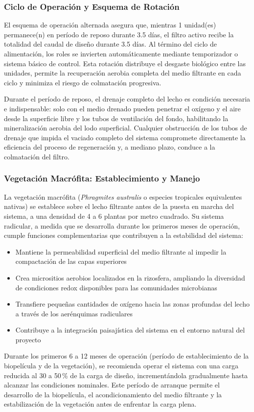 \subsubsection*{Ciclo de Operación y Esquema de Rotación}

El esquema de operación alternada asegura que, mientras 1 unidad(es) permanece(n) en período de reposo durante 3.5 días, el filtro activo recibe la totalidad del caudal de diseño durante 3.5 días. Al término del ciclo de alimentación, los roles se invierten automáticamente mediante temporizador o sistema básico de control. Esta rotación distribuye el desgaste biológico entre las unidades, permite la recuperación aerobia completa del medio filtrante en cada ciclo y minimiza el riesgo de colmatación progresiva.

Durante el período de reposo, el drenaje completo del lecho es condición necesaria e indispensable: solo con el medio drenado pueden penetrar el oxígeno y el aire desde la superficie libre y los tubos de ventilación del fondo, habilitando la mineralización aerobia del lodo superficial. Cualquier obstrucción de los tubos de drenaje que impida el vaciado completo del sistema compromete directamente la eficiencia del proceso de regeneración y, a mediano plazo, conduce a la colmatación del filtro.

\subsubsection*{Vegetación Macrófita: Establecimiento y Manejo}

La vegetación macrófita (\textit{Phragmites australis} o especies tropicales equivalentes nativas) se establece sobre el lecho filtrante antes de la puesta en marcha del sistema, a una densidad de 4 a 6 plantas por metro cuadrado. Su sistema radicular, a medida que se desarrolla durante los primeros meses de operación, cumple funciones complementarias que contribuyen a la estabilidad del sistema:

\begin{itemize}[noitemsep,leftmargin=2em]
    \item Mantiene la permeabilidad superficial del medio filtrante al impedir la compactación de las capas superiores
    \item Crea micrositios aerobios localizados en la rizosfera, ampliando la diversidad de condiciones redox disponibles para las comunidades microbianas
    \item Transfiere pequeñas cantidades de oxígeno hacia las zonas profundas del lecho a través de los aerénquimas radiculares
    \item Contribuye a la integración paisajística del sistema en el entorno natural del proyecto
\end{itemize}

Durante los primeros 6 a 12 meses de operación (período de establecimiento de la biopelícula y de la vegetación), se recomienda operar el sistema con una carga reducida al 30 a 50\,\% de la carga de diseño, incrementándola gradualmente hasta alcanzar las condiciones nominales. Este período de arranque permite el desarrollo de la biopelícula, el acondicionamiento del medio filtrante y la estabilización de la vegetación antes de enfrentar la carga plena.

